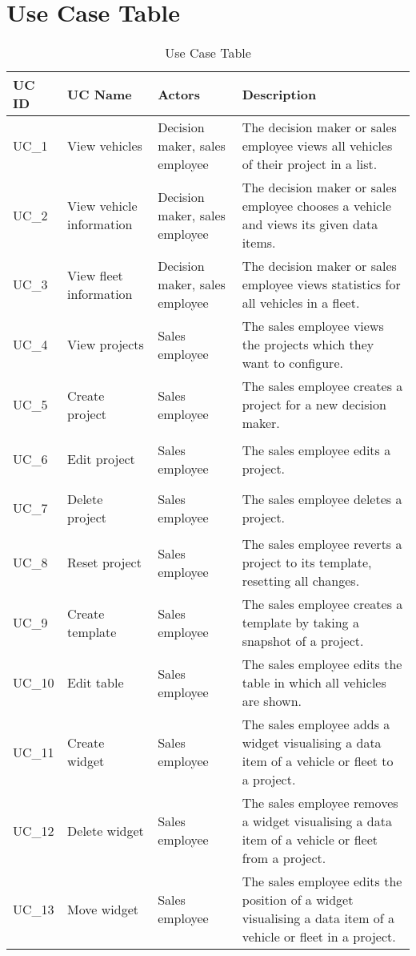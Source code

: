 \section{Use Case Table}
\sffamily
\begin{footnotesize}
  \renewcommand{\arraystretch}{1.4}
  \begin{longtable}[i i i L]{ p{} p{} p{} p{} }
    \caption                       %
        {Use Case Table} %
        \\
    \toprule
    \textbf{UC ID} & \textbf{UC Name} & \textbf{Actors}  & \textbf{Description}\\
    \midrule
    \hypertarget{Ref:UC1}{UC\_1} & View vehicles & Decision maker, sales employee & The decision maker or sales employee views all vehicles of their project in a list.\\
    \hypertarget{Ref:UC2}{UC\_2} & View vehicle information & Decision maker, sales employee & The decision maker or sales employee chooses a vehicle and views its given data items.\\
    \hypertarget{Ref:UC3}{UC\_3}  & View fleet information & Decision maker, sales employee & The decision maker or sales employee views statistics for all vehicles in a fleet.\\
    \hypertarget{Ref:UC4}{UC\_4}  & View projects & Sales employee & The sales employee views the projects which they want to configure.\\
    \hypertarget{Ref:UC5}{UC\_5} & Create project & Sales employee & The sales employee creates a project for a new decision maker.\\
    \hypertarget{Ref:UC6}{UC\_6} & Edit project & Sales employee & The sales employee edits a project.\\
    \hypertarget{Ref:UC7}{UC\_7} & Delete project & Sales employee & The sales employee deletes a project.\\
    \hypertarget{Ref:UC8}{UC\_8} & Reset project & Sales employee & The sales employee reverts a project to its template, resetting all changes.\\
    \hypertarget{Ref:UC9}{UC\_9} & Create template & Sales employee & The sales employee creates a template by taking a snapshot of a project.\\
    \hypertarget{Ref:UC10}{UC\_10} & Edit table & Sales employee & The sales employee edits the table in which all vehicles are shown.\\
    \hypertarget{Ref:UC11}{UC\_11} & Create widget & Sales employee & The sales employee adds a widget visualising a data item of a vehicle or fleet to a project.\\
    \hypertarget{Ref:UC12}{UC\_12} & Delete widget & Sales employee & The sales employee removes a widget visualising a data item of a vehicle or fleet from a project.\\
    \hypertarget{Ref:UC13}{UC\_13} & Move widget & Sales employee & The sales employee edits the position of a widget visualising a data item of a vehicle or fleet in a project.\\
    \bottomrule
  \end{longtable}
\end{footnotesize}
